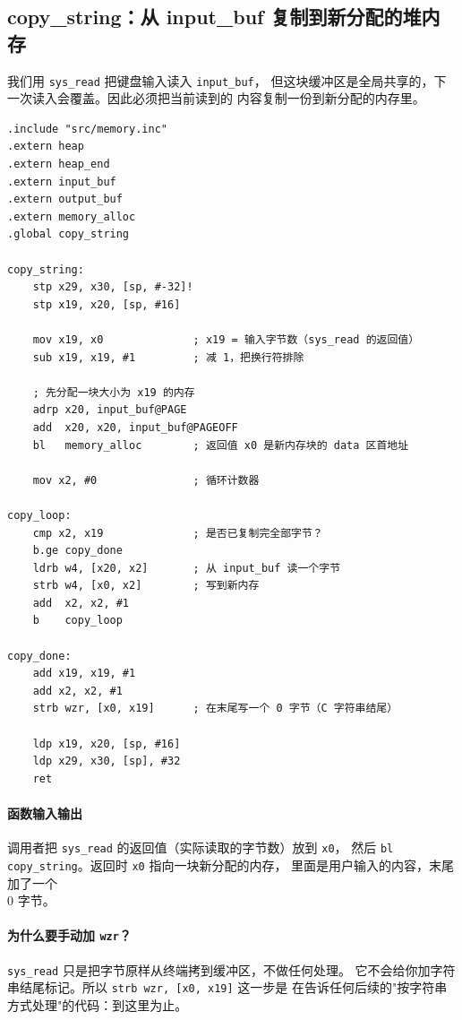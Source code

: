\subsection{copy\_string：从 input\_buf 复制到新分配的堆内存}

我们用 \texttt{sys\_read} 把键盘输入读入 \texttt{input\_buf}，
但这块缓冲区是全局共享的，下一次读入会覆盖。因此必须把当前读到的
内容复制一份到新分配的内存里。

\begin{lstlisting}[style=asm,caption=memorycopy.s — copy\_string]
.include "src/memory.inc"
.extern heap
.extern heap_end
.extern input_buf
.extern output_buf
.extern memory_alloc
.global copy_string

copy_string:
    stp x29, x30, [sp, #-32]!
    stp x19, x20, [sp, #16]

    mov x19, x0              ; x19 = 输入字节数（sys_read 的返回值）
    sub x19, x19, #1         ; 减 1，把换行符排除

    ; 先分配一块大小为 x19 的内存
    adrp x20, input_buf@PAGE
    add  x20, x20, input_buf@PAGEOFF
    bl   memory_alloc        ; 返回值 x0 是新内存块的 data 区首地址

    mov x2, #0               ; 循环计数器

copy_loop:
    cmp x2, x19              ; 是否已复制完全部字节？
    b.ge copy_done
    ldrb w4, [x20, x2]       ; 从 input_buf 读一个字节
    strb w4, [x0, x2]        ; 写到新内存
    add  x2, x2, #1
    b    copy_loop

copy_done:
    add x19, x19, #1
    add x2, x2, #1
    strb wzr, [x0, x19]      ; 在末尾写一个 0 字节（C 字符串结尾）

    ldp x19, x20, [sp, #16]
    ldp x29, x30, [sp], #32
    ret
\end{lstlisting}

\paragraph{函数输入输出}
调用者把 \texttt{sys\_read} 的返回值（实际读取的字节数）放到 \texttt{x0}，
然后 \texttt{bl copy\_string}。返回时 \texttt{x0} 指向一块新分配的内存，
里面是用户输入的内容，末尾加了一个 \\0 字节。

\paragraph{为什么要手动加 \texttt{wzr}？}
\texttt{sys\_read} 只是把字节原样从终端拷到缓冲区，不做任何处理。
它不会给你加字符串结尾标记。所以 \texttt{strb wzr, [x0, x19]} 这一步是
在告诉任何后续的"按字符串方式处理"的代码：到这里为止。

